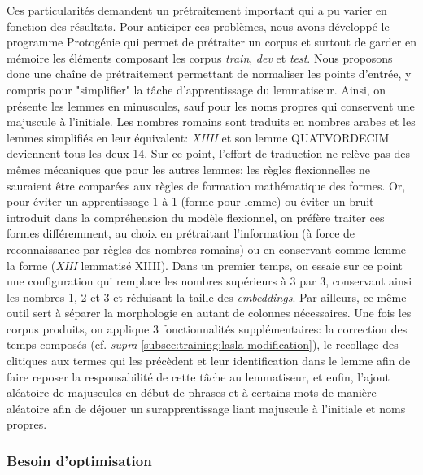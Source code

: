 Ces particularités demandent un prétraitement important qui a pu varier en fonction des résultats. Pour anticiper ces problèmes, nous avons développé le programme Protogénie qui permet de prétraiter un corpus et surtout de garder en mémoire les éléments composant les corpus \textit{train}, \textit{dev} et \textit{test}. Nous proposons donc une chaîne de prétraitement permettant de normaliser les points d'entrée, y compris pour "simplifier" la tâche d'apprentissage du lemmatiseur. Ainsi, on présente les lemmes en minuscules, sauf pour les noms propres qui conservent une majuscule à l'initiale. Les nombres romains sont traduits en nombres arabes et les lemmes simplifiés en leur équivalent: \textit{XIIII} et son lemme \textsc{QUATVORDECIM} deviennent tous les deux 14. Sur ce point, l'effort de traduction ne relève pas des mêmes mécaniques que pour les autres lemmes: les règles flexionnelles ne sauraient être comparées aux règles de formation mathématique des formes. Or, pour éviter un apprentissage 1 à 1 (forme pour lemme) ou éviter un bruit introduit dans la compréhension du modèle flexionnel, on préfère traiter ces formes différemment, au choix en prétraitant l'information (à force de reconnaissance par règles des nombres romains) ou en conservant comme lemme la forme (\textit{XIII} lemmatisé \textsc{XIIII}). Dans un premier temps, on essaie sur ce point une configuration qui remplace les nombres supérieurs à 3 par 3, conservant ainsi les nombres 1, 2 et 3 et réduisant la taille des \textit{embeddings}. Par ailleurs, ce même outil sert à séparer la morphologie en autant de colonnes nécessaires. Une fois les corpus produits, on applique 3 fonctionnalités supplémentaires: la correction des temps composés (cf. \textit{supra} \ref{subsec:training:lasla-modification}), le recollage des clitiques aux termes qui les précèdent et leur identification dans le lemme afin de faire reposer la responsabilité de cette tâche au lemmatiseur, et enfin, l'ajout aléatoire de majuscules en début de phrases et à certains mots de manière aléatoire afin de déjouer un surapprentissage liant majuscule à l'initiale et noms propres.

\subsubsection{Besoin d'optimisation}

